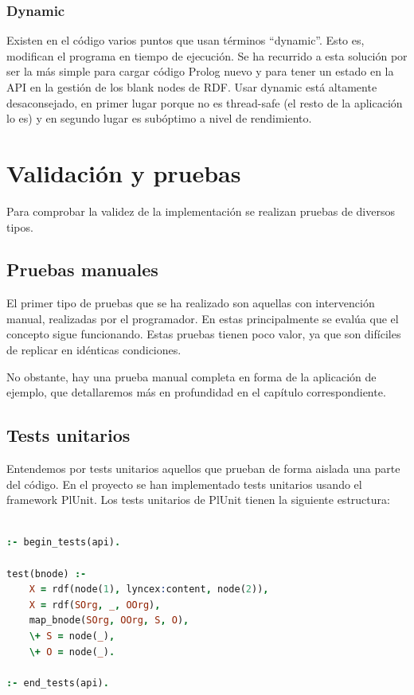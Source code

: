 \documentclass[12pt]{report} %
\begin{document}
\subsection{Dynamic}

Existen en el código varios puntos que usan términos ``dynamic''. Esto es, modifican el programa en tiempo de ejecución. Se ha recurrido a esta solución por ser la más simple para cargar código Prolog nuevo y para tener un estado en la API en la gestión de los blank nodes de RDF. Usar dynamic está altamente desaconsejado, en primer lugar porque no es thread-safe (el resto de la aplicación lo es) y en segundo lugar es subóptimo a nivel de rendimiento.


\chapter{Validación y pruebas}

Para comprobar la validez de la implementación se realizan pruebas de diversos tipos.

\section{Pruebas manuales}

El primer tipo de pruebas que se ha realizado son aquellas con intervención manual, realizadas por el programador. En estas principalmente se evalúa que el concepto sigue funcionando. Estas pruebas tienen poco valor, ya que son difíciles de replicar en idénticas condiciones.

No obstante, hay una prueba manual completa en forma de la aplicación de ejemplo, que detallaremos más en profundidad en el capítulo correspondiente.

\section{Tests unitarios}

Entendemos por tests unitarios aquellos que prueban de forma aislada una parte del código. En el proyecto se han implementado tests unitarios usando el framework PlUnit. Los tests unitarios de PlUnit tienen la siguiente estructura:

\begin{lstlisting}[language=Prolog]

:- begin_tests(api).

test(bnode) :-
    X = rdf(node(1), lyncex:content, node(2)),
    X = rdf(SOrg, _, OOrg),
    map_bnode(SOrg, OOrg, S, O),
    \+ S = node(_),
    \+ O = node(_).

:- end_tests(api).

\end{lstlisting}
\end{document}
